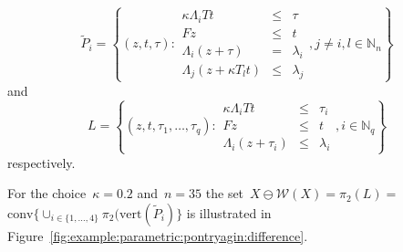 \documentclass[smallextended]{svjour3}       %
\numberwithin{equation}{section}
\providecommand{\conv}{\text{conv}}
\begin{document}
$$
\tilde P_i= \left\{(z,t,\tau): \begin{array}{rcl}\kappa\Lambda_i Tt &\leq& \tau\\ Fz&\leq& t\\ \Lambda_i(z+\tau)&=&\lambda_i\\ \Lambda_j(z+\kappa T_lt)&\leq&\lambda_j\end{array},j\neq i,l\in\mathbb N_n\right\}
$$
%
and
$$
L = \left\{(z,t,\tau_1,\dots,\tau_q):\begin{array}{rcl}
\kappa\Lambda_i Tt & \leq &\tau_i\\
Fz &\leq& t\\
\Lambda_i(z+\tau_i)&\leq&\lambda_i
\end{array},i\in\mathbb N_q\right\}
$$
%
respectively.

For the choice~$\kappa=0.2$ and~$n = 35$ the set~$X\ominus\mathcal W(X)=\pi_2(L)=$\linebreak $\conv\{\cup_{i\in\{1,\dots,4\}}\pi_2(\text{vert}(\tilde P_i)\}$ is illustrated in Figure~\ref{fig:example:parametric:pontryagin:difference}.
\end{document}
